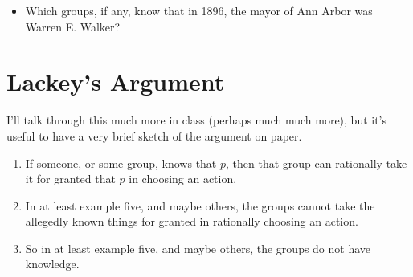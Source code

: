 \documentclass[
  11pt,
]{article}
\providecommand{\tightlist}{%
  \setlength{\itemsep}{0pt}\setlength{\parskip}{0pt}}
\begin{document}
\begin{itemize}
\tightlist
\item
  Which groups, if any, know that in 1896, the mayor of Ann Arbor was
  Warren E. Walker?
\end{itemize}

\hypertarget{lackeys-argument}{%
\section{Lackey's Argument}\label{lackeys-argument}}

I'll talk through this much more in class (perhaps much much more), but
it's useful to have a very brief sketch of the argument on paper.

\begin{enumerate}
\def\labelenumi{\arabic{enumi}.}
\tightlist
\item
  If someone, or some group, knows that \(p\), then that group can
  rationally take it for granted that \(p\) in choosing an action.
\item
  In at least example five, and maybe others, the groups cannot take the
  allegedly known things for granted in rationally choosing an action.
\item
  So in at least example five, and maybe others, the groups do not have
  knowledge.
\end{enumerate}
\end{document}
